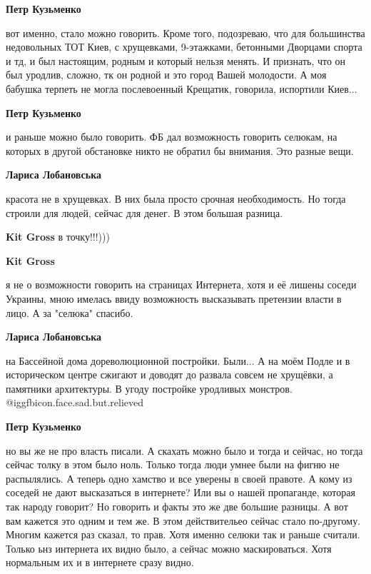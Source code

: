 \begin{itemize}
\begin{itemize}
\begin{itemize} %
\textbf{Петр Кузьменко} 

вот именно, стало можно говорить. Кроме того, подозреваю, что для большинства
недовольных ТОТ Киев, с хрущевками, 9-этажками, бетонными Дворцами спорта и тд,
и был настоящим, родным и который нельзя менять. И признать, что он был
уродлив, сложно, тк он родной и это город Вашей молодости. А моя бабушка
терпеть не могла послевоенный Крещатик, говорила, испортили Киев...


\textbf{Петр Кузьменко} 

и раньше можно было говорить. ФБ дал возможность говорить селюкам, на которых в
другой обстановке никто не обратил бы внимания. Это разные вещи.

\textbf{Лариса Лобановська} 

красота не в хрущевках. В них была просто срочная необходимость. Но тогда
строили для людей, сейчас для денег. В этом большая разница.

\textbf{Kit Gross} в точку!!!)))

\textbf{Kit Gross} 

я не о возможности говорить на страницах Интернета, хотя и её лишены соседи
Украины, мною имелась ввиду возможность высказывать претензии власти в лицо. А
за "селюка" спасибо.

\textbf{Лариса Лобановська} 

на Бассейной дома дореволюционной постройки. Были... А на моём Подле и в
историческом центре сжигают и доводят до развала совсем не хрущёвки, а
памятники архитектуры. В угоду постройке уродливых монстров. @igg{fbicon.face.sad.but.relieved} 

\textbf{Петр Кузьменко} 

но вы же не про власть писали. А скахать можно было и тогда и сейчас, но тогда
сейчас толку в этом было ноль. Только тогда люди умнее были на фигню не
распылялись. А теперь одно хамство и все уверены в своей правоте. А кому из
соседей не дают высказаться в интернете? Или вы о нашей пропаганде, которая так
народу говорит? Но говорить и факты это же две большие разницы. А вот вам
кажется это одним и тем же. В этом действительео сейчас стало по-другому.
Многим кажется раз сказал, то прав. Хотя именно селюки так и раньше считали.
Только ьнз интернета их видно было, а сейчас можно маскироваться. Хотя
нормальным их и в интернете сразу видно.


\end{itemize}
\end{itemize}
\end{itemize}

